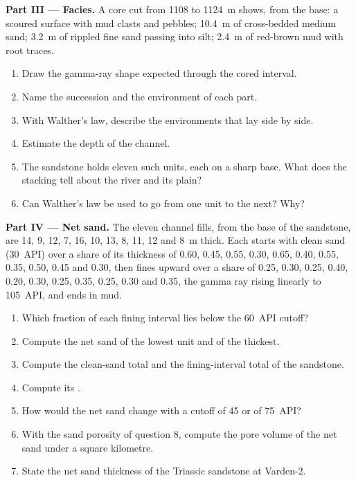 \begin{problem}
\medskip\noindent\textbf{Part III --- Facies.} A core cut from 1108 to
\qty{1124}{m} shows, from the base: a scoured surface with mud clasts and
pebbles; \qty{10.4}{m} of cross-bedded medium sand; \qty{3.2}{m} of rippled
fine sand passing into silt; \qty{2.4}{m} of red-brown mud with root traces.
\begin{enumerate}[resume]
\item Draw the gamma-ray shape expected through the cored interval.
\item Name the succession and the environment of each part.
\item With Walther's law, describe the environments that lay side by side.
\item Estimate the depth of the channel.
\item The sandstone holds eleven such units, each on a sharp base. What does
  the stacking tell about the river and its plain?
\item Can Walther's law be used to go from one unit to the next? Why?
\end{enumerate}

\medskip\noindent\textbf{Part IV --- Net sand.} The eleven channel fills,
from the base of the sandstone, are 14, 9, 12, 7, 16, 10, 13, 8, 11, 12 and
\qty{8}{m} thick. Each starts with clean sand (\qty{30}{API}) over a share
of its thickness of 0.60, 0.45, 0.55, 0.30, 0.65, 0.40, 0.55, 0.35, 0.50,
0.45 and 0.30, then fines upward over a share of 0.25, 0.30, 0.25, 0.40,
0.20, 0.30, 0.25, 0.35, 0.25, 0.30 and 0.35, the gamma ray rising linearly to
\qty{105}{API}, and ends in mud.
\begin{enumerate}[resume]
\item Which fraction of each fining interval lies below the \qty{60}{API}
  cutoff?
\item Compute the net sand of the lowest unit and of the thickest.
\item Compute the clean-sand total and the fining-interval total of the
  sandstone.
\item Compute its .
\item How would the net sand change with a cutoff of 45 or of
  \qty{75}{API}?
\item With the sand porosity of question 8, compute the pore volume of the
  net sand under a square kilometre.
\item State the net sand thickness of the Triassic sandstone at Varden-2.
\end{enumerate}
\end{problem}
